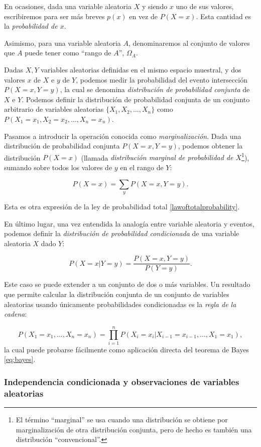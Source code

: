 En ocasiones, dada una variable aleatoria $X$ y siendo $x$ uno de sus valores, escribiremos para ser más breves 
$p(x)$ en vez de $P(X=x)$. Esta cantidad es la {\em probabilidad de $x$}.

Asimismo, para una variable aleatoria $A$, denominaremos al conjunto de valores que $A$ puede tener como 
``rango de $A$'', $\Omega_A$.

Dadas $X,Y$ variables aleatorias definidas en el mismo espacio muestral, y dos valores $x$ de $X$ e $y$ de 
$Y$, podemos medir la probabilidad del evento intersección $P(X=x, Y=y)$, la cual se denomina {\em distribución 
de probabilidad conjunta} de $X$ e $Y$. Podemos definir la distribución de probabilidad conjunta de un conjunto 
arbitrario de variables aleatorias $\{X_1, X_2, \dots, X_n \}$ como $P(X_1=x_1, X_2=x_2,\dots, X_n=x_n )$.

Pasamos a introducir la operación conocida como {\em marginalización}. Dada una distribución de probabilidad 
conjunta $P(X=x,Y=y)$, podemos obtener la distribución $P(X=x)$ (llamada {\em distribución marginal de 
probabilidad de $X$}\footnote{El término ``marginal'' se usa cuando una distribución se obtiene por marginalización 
de otra distribución conjunta, pero de hecho es también una distribución ``convencional''.}), sumando sobre todos 
los valores de $y$ en el rango de $Y$: 

$$P(X=x) = \sum_y P(X=x, Y=y).$$

Esta es otra expresión de la ley de probabilidad total \ref{lawoftotalprobability}.

En último lugar, una vez entendida la analogía entre variable aleatoria y eventos, podemos definir la 
{\em distribución de probabilidad condicionada} de una variable aleatoria $X$ dado $Y$:

$$P(X=x|Y=y) = \frac{P(X=x, Y=y)}{P(Y=y)}.$$

Este caso se puede extender a un conjunto de dos o más variables. Un resultado que permite calcular la 
distribución conjunta de un conjunto de variables aleatorias usando únicamente probabilidades condicionadas 
es la {\em regla de la cadena}:

$$P(X_1=x_1, \dots, X_n=x_n) = \prod_{i=1}^n P(X_i=x_i|X_{i-1}=x_{i-1}, \dots, X_1=x_1),$$ la cual puede 
probarse fácilmente como aplicación directa del teorema de Bayes \ref{eq:bayes}.

\subsubsection{Independencia condicionada y observaciones de variables aleatorias}

